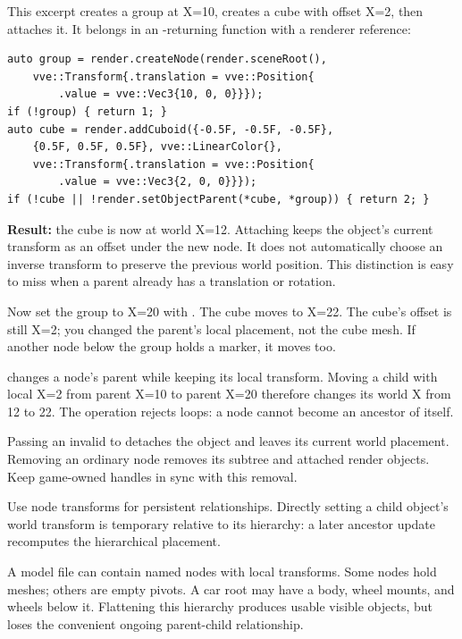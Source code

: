 \documentclass[11pt,a4paper]{article}
\begin{document}
This excerpt creates a group at X=10, creates a cube with offset X=2, then attaches it. It belongs in an -returning function with a renderer reference:
\begin{lstlisting}
auto group = render.createNode(render.sceneRoot(),
    vve::Transform{.translation = vve::Position{
        .value = vve::Vec3{10, 0, 0}}});
if (!group) { return 1; }
auto cube = render.addCuboid({-0.5F, -0.5F, -0.5F},
    {0.5F, 0.5F, 0.5F}, vve::LinearColor{},
    vve::Transform{.translation = vve::Position{
        .value = vve::Vec3{2, 0, 0}}});
if (!cube || !render.setObjectParent(*cube, *group)) { return 2; }
\end{lstlisting}
\textbf{Result:} the cube is now at world X=12. Attaching keeps the object's current transform as an offset under the new node. It does not automatically choose an inverse transform to preserve the previous world position. This distinction is easy to miss when a parent already has a translation or rotation.

Now set the group to X=20 with . The cube moves to X=22. The cube's offset is still X=2; you changed the parent's local placement, not the cube mesh. If another node below the group holds a marker, it moves too.

 changes a node's parent while keeping its local transform. Moving a child with local X=2 from parent X=10 to parent X=20 therefore changes its world X from 12 to 22. The operation rejects loops: a node cannot become an ancestor of itself.

Passing an invalid  to  detaches the object and leaves its current world placement. Removing an ordinary node removes its subtree and attached render objects. Keep game-owned handles in sync with this removal.

\begin{remember}Use node transforms for persistent relationships. Directly setting a child object's world transform is temporary relative to its hierarchy: a later ancestor update recomputes the hierarchical placement.\end{remember}

A model file can contain named nodes with local transforms. Some nodes hold meshes; others are empty pivots. A car root may have a body, wheel mounts, and wheels below it. Flattening this hierarchy produces usable visible objects, but loses the convenient ongoing parent-child relationship.
\end{document}
